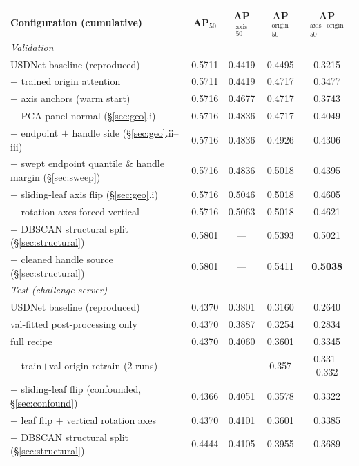 \documentclass[11pt]{article}
\newcommand{\metric}{AP$_{50}^{\text{axis+origin}}$}
\newcommand{\apfifty}{AP$_{50}$}
\begin{document}
\begin{table}[t]
\centering
\small
\begin{tabular}{lcccc}
\toprule
Configuration (cumulative) & \apfifty{} & AP$_{50}^{\text{axis}}$ & AP$_{50}^{\text{origin}}$ & \metric{} \\
\midrule
\multicolumn{5}{l}{\emph{Validation}}\\
USDNet baseline (reproduced)          & 0.5711 & 0.4419 & 0.4495 & 0.3215 \\
$+$ trained origin attention          & 0.5711 & 0.4419 & 0.4717 & 0.3477 \\
$+$ axis anchors (warm start)          & 0.5716 & 0.4677 & 0.4717 & 0.3743 \\
$+$ PCA panel normal (\S\ref{sec:geo}.i)   & 0.5716 & 0.4836 & 0.4717 & 0.4049 \\
$+$ endpoint $+$ handle side (\S\ref{sec:geo}.ii--iii) & 0.5716 & 0.4836 & 0.4926 & 0.4306 \\
$+$ swept endpoint quantile \& handle margin (\S\ref{sec:sweep}) & 0.5716 & 0.4836 & 0.5018 & 0.4395 \\
$+$ sliding-leaf axis flip (\S\ref{sec:geo}.i) & 0.5716 & 0.5046 & 0.5018 & 0.4605 \\
$+$ rotation axes forced vertical & 0.5716 & 0.5063 & 0.5018 & 0.4621 \\
$+$ DBSCAN structural split (\S\ref{sec:structural}) & 0.5801 & --- & 0.5393 & 0.5021 \\
$+$ cleaned handle source (\S\ref{sec:structural}) & 0.5801 & --- & 0.5411 & \textbf{0.5038} \\
\midrule
\multicolumn{5}{l}{\emph{Test (challenge server)}}\\
USDNet baseline (reproduced)          & 0.4370 & 0.3801 & 0.3160 & 0.2640 \\
val-fitted post-processing only       & 0.4370 & 0.3887 & 0.3254 & 0.2834 \\
full recipe                           & 0.4370 & 0.4060 & 0.3601 & 0.3345 \\
\quad $+$ train$+$val origin retrain (2 runs) & --- & --- & 0.357 & 0.331--0.332 \\
\quad \quad $+$ sliding-leaf flip (confounded, \S\ref{sec:confound}) & 0.4366 & 0.4051 & 0.3578 & 0.3322 \\
$+$ leaf flip $+$ vertical rotation axes & 0.4370 & 0.4101 & 0.3601 & 0.3385 \\
$+$ DBSCAN structural split (\S\ref{sec:structural}) & 0.4444 & 0.4105 & 0.3955 & 0.3689 \\

\end{tabular}
\end{table}
\end{document}
